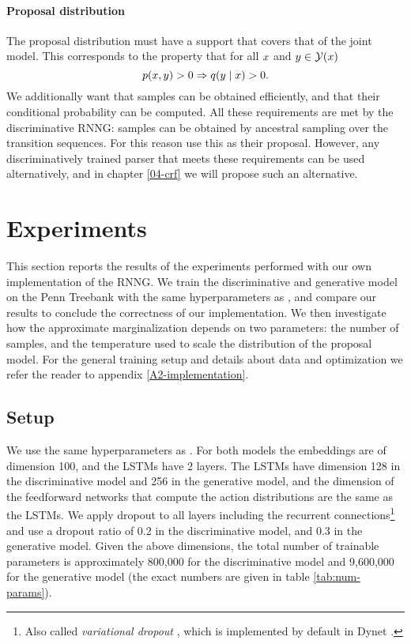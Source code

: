     \paragraph{Proposal distribution}
    The proposal distribution must have a support that covers that of the joint model. This corresponds to the property that for all $x$ and $y \in \mathcal{Y}(x)$
    \begin{equation*}
      p(x, y) > 0 \Rightarrow q( y \mid x ) > 0.
    \end{equation*}
    We additionally want that samples can be obtained efficiently, and that their conditional probability can be computed. All these requirements are met by the discriminative RNNG: samples can be obtained by ancestral sampling over the transition sequences. For this reason \citet{dyer2016rnng} use this as their proposal. However, any discriminatively trained parser that meets these requirements can be used alternatively, and in chapter \ref{04-crf} we will propose such an alternative.

\section{Experiments}
  This section reports the results of the experiments performed with our own implementation of the RNNG. We train the discriminative and generative model on the Penn Treebank with the same hyperparameters as \citet{dyer2016rnng}, and compare our results to conclude the correctness of our implementation. We then investigate how the approximate marginalization depends on two parameters: the number of samples, and the temperature used to scale the distribution of the proposal model. For the general training setup and details about data and optimization we refer the reader to appendix \ref{A2-implementation}.

  \subsection{Setup}
    We use the same hyperparameters as \citep{dyer2016rnng}. For both models the embeddings are of dimension 100, and the LSTMs have 2 layers. The LSTMs have dimension 128 in the discriminative model and 256 in the generative model, and the dimension of the feedforward networks that compute the action distributions are the same as the LSTMs. We apply dropout to all layers including the recurrent connections\footnote{Also called \textit{variational dropout} \citep{gal2016theoretically}, which is implemented by default in Dynet \citep{neubig2017dynet}.} and use a dropout ratio of 0.2 in the discriminative model, and 0.3 in the generative model. Given the above dimensions, the total number of trainable parameters is approximately 800,000 for the discriminative model and 9,600,000 for the generative model (the exact numbers are given in table \ref{tab:num-params}).

